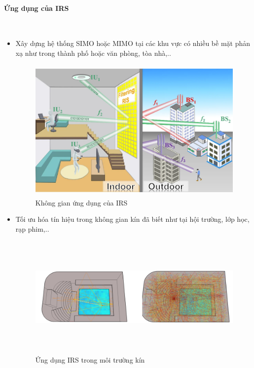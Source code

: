 \documentclass{article}
\begin{document}
\paragraph{Ứng dụng của IRS}\\
\begin{itemize}

\item  Xây dựng hệ thống SIMO hoặc MIMO tại các khu vực có nhiều bề mặt phản xạ như trong thành phố hoặc văn phòng, tòa nhà,..\\
\begin{figure}[h!]
    \centering
    \includegraphics[width 12cm, height = 7cm]{photo/2.4.4.png}
    \caption{Không gian ứng dụng của IRS}
    \label{Hình 8}
\end{figure}

\item Tối ưu hóa tín hiệu trong không gian kín đã biết như tại hội trường, lớp học, rạp phim,..\\
\begin{figure}[h!]
    \centering
     \includegraphics[width = 14cm, height = 6cm]{photo/2.4.5.png}
    \caption{Ứng dụng IRS trong môi trường kín}
    \label{Hình 9}
\end{figure}
\end{itemize}
\newpage
\end{document}
